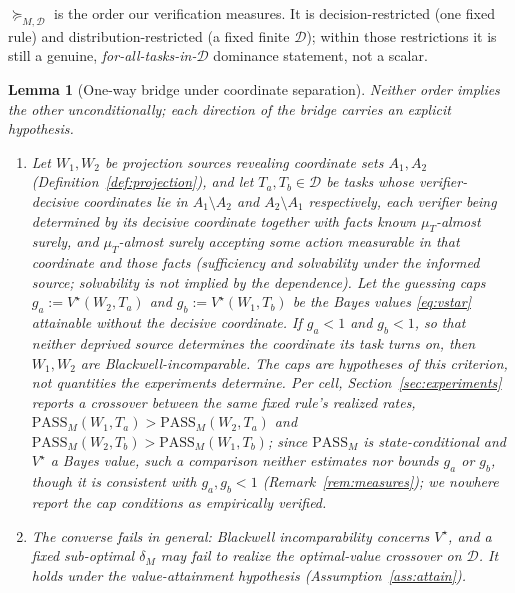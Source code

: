 \documentclass[11pt]{article}
\theoremstyle{plain}
\newtheorem{lemma}{Lemma}
\theoremstyle{definition}
\theoremstyle{remark}
\newcommand{\PASS}{\mathrm{PASS}}
\newcommand{\Dcal}{\mathcal{D}}
\begin{document}
$\succeq_{M,\Dcal}$ is the order our verification measures. It is decision-restricted (one fixed
rule) and distribution-restricted (a fixed finite $\Dcal$); within those restrictions it is still a
genuine, \emph{for-all-tasks-in-$\Dcal$} dominance statement, not a scalar.

\begin{lemma}[One-way bridge under coordinate separation]
\label{lem:bridge}
Neither order implies the other unconditionally; each direction of the bridge carries an explicit
hypothesis.
\begin{enumerate}
  \item[\textup{(a)}] Let $W_1, W_2$ be projection sources revealing coordinate sets $A_1, A_2$
    (Definition~\ref{def:projection}), and let $T_a, T_b \in \Dcal$ be tasks whose
    verifier-decisive coordinates lie in $A_1 \setminus A_2$ and $A_2 \setminus A_1$
    respectively, each verifier being determined by its decisive coordinate together with facts
    known $\mu_T$-almost surely, and $\mu_T$-almost surely accepting some action measurable in that
    coordinate and those facts (\emph{sufficiency and solvability under the informed source};
    solvability is not implied by the dependence). Let the
    \emph{guessing caps} $g_a := V^\star(W_2, T_a)$ and $g_b := V^\star(W_1, T_b)$ be the Bayes
    values \eqref{eq:vstar} attainable \emph{without} the decisive coordinate. If $g_a < 1$ and
    $g_b < 1$, so that neither deprived source determines the coordinate its task turns on, then
    $W_1, W_2$ are Blackwell-incomparable. The caps are hypotheses of this criterion, not
    quantities the experiments determine. Per cell, Section~\ref{sec:experiments} reports a
    crossover between the same fixed rule's \emph{realized} rates,
    $\PASS_M(W_1,T_a) > \PASS_M(W_2,T_a)$ and $\PASS_M(W_2,T_b) > \PASS_M(W_1,T_b)$; since
    $\PASS_M$ is state-conditional and $V^\star$ a Bayes value, such a comparison neither
    estimates nor bounds $g_a$ or $g_b$, though it is consistent with $g_a, g_b < 1$
    (Remark~\ref{rem:measures}); we nowhere report the cap conditions as empirically verified.
  \item[\textup{(b)}] The converse fails in general: Blackwell incomparability concerns $V^\star$,
    and a fixed sub-optimal $\delta_M$ may fail to realize the optimal-value crossover on $\Dcal$.
    It holds under the value-attainment hypothesis (Assumption~\ref{ass:attain}).
\end{enumerate}
\end{lemma}
\end{document}
